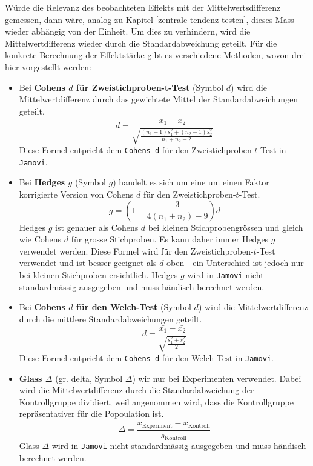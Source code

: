 \documentclass[
]{book}
\providecommand{\tightlist}{%
  \setlength{\itemsep}{0pt}\setlength{\parskip}{0pt}}
\theoremstyle{definition}
\theoremstyle{definition}
\theoremstyle{definition}
\theoremstyle{definition}
\theoremstyle{remark}
\begin{document}
Würde die Relevanz des beobachteten Effekts mit der Mittelwertsdifferenz gemessen, dann wäre, analog zu Kapitel \ref{zentrale-tendenz-testen}, dieses Mass wieder abhängig von der Einheit. Um dies zu verhindern, wird die Mittelwertdifferenz wieder durch die Standardabweichung geteilt. Für die konkrete Berechnung der Effektstärke gibt es verschiedene Methoden, wovon drei hier vorgestellt werden:

\begin{itemize}
\tightlist
\item
  \label{customdef-cohens-d}{Bei \textbf{Cohens \(d\) für Zweistichproben-t-Test} (Symbol \(d\)) wird die Mittelwertdifferenz durch das gewichtete Mittel der Standardabweichungen geteilt.}
  \[d = \frac{\bar{x_1}-\bar{x_2}}{\sqrt{\frac{(n_1 - 1) s_1^2+(n_2-1)s_2^2}{n_1 + n_2 - 2}}}\]
  Diese Formel entpricht dem \texttt{Cohens\ d} für den Zweistichproben-\(t\)-Test in \texttt{Jamovi}.
\item
  \label{customdef-hedges-g}{Bei \textbf{Hedges \(g\)} (Symbol \(g\)) handelt es sich um eine um einen Faktor korrigierte Version von Cohens \(d\) für den Zweistichproben-\(t\)-Test.}
  \[g = \left(1-\frac{3}{4(n_1+n_2)-9}\right)d\]
  Hedges \(g\) ist genauer als Cohens \(d\) bei kleinen Stichprobengrössen und gleich wie Cohens \(d\) für grosse Stichproben. Es kann daher immer Hedges \(g\) verwendet werden. Diese Formel wird für den Zweistichproben-\(t\)-Test verwendet und ist besser geeignet als \(d\) oben - ein Unterschied ist jedoch nur bei kleinen Stichproben ersichtlich. Hedges \(g\) wird in \texttt{Jamovi} nicht standardmässig ausgegeben und muss händisch berechnet werden.
\item
  \label{customdef-cohens-d}{Bei \textbf{Cohens \(d\) für den Welch-Test} (Symbol \(d\)) wird die Mittelwertdifferenz durch die mittlere Standardabweichungen geteilt.}
  \[d = \frac{\bar{x_1}-\bar{x_2}}{\sqrt{\frac{s_1^2+s_2^2}{2}}}\]
  Diese Formel entpricht dem \texttt{Cohens\ d} für den Welch-Test in \texttt{Jamovi}.
\item
  \label{customdef-glass-delta}{\textbf{Glass \(\Delta\)} (gr. delta, Symbol \(\Delta\)) wir nur bei Experimenten verwendet. Dabei wird die Mittelwertdifferenz durch die Standardabweichung der Kontrollgruppe dividiert, weil angenommen wird, dass die Kontrollgruppe repräsentativer für die Popoulation ist.}
  \[\Delta = \frac{\bar{x}_\text{Experiment}-\bar{x}_\text{Kontroll}}{s_\text{Kontroll}}\]
  Glass \(\Delta\) wird in \texttt{Jamovi} nicht standardmässig ausgegeben und muss händisch berechnet werden.
\end{itemize}
\end{document}

